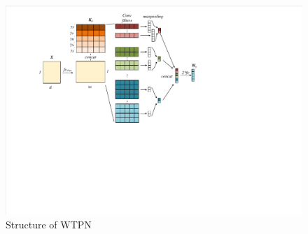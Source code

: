 \begin{figure}[htbp]
	\hspace{0ex}
	\vspace{0ex}
	\centering
	\includegraphics[width = \textwidth]{fig/WTPN}
	\caption{Structure of WTPN}
	\label{fig:WTPN}
\end{figure}